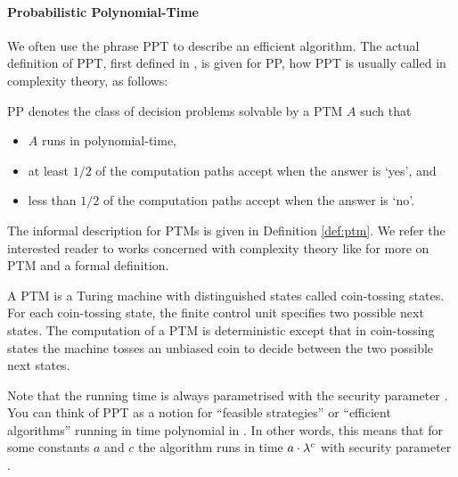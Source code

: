 \paragraph{Probabilistic Polynomial-Time}
We often use the phrase \ac{PPT} to describe an efficient algorithm.
The actual definition of \ac{PPT}, first defined in \cite{gill1977}, is given for \ac{PP}, how \ac{PPT} is usually called in complexity theory, as follows:

\begin{definition}[\acl{PP}]\label{def:ppt}
\ac{PP} denotes the class of decision problems solvable by a \ac{PTM} $A$ such that
\begin{itemize}
	\item $A$ runs in polynomial-time,
	\item at least $1/2$ of the computation paths accept when the answer is `yes', and
	\item less than $1/2$ of the computation paths accept when the answer is `no'. \eod
\end{itemize}
\end{definition}

\noindent
The informal description for \aclp{PTM} is given in Definition \ref{def:ptm}.
We refer the interested reader to works concerned with complexity theory like \cite{santos1969,WaterlooComplexity} for more on \ac{PTM} and a formal definition.

\begin{definition}\label{def:ptm}
A \ac{PTM} is a Turing machine with distinguished states called coin-tossing states.
For each coin-tossing state, the finite control unit specifies two possible next states.
The computation of a \ac{PTM} is deterministic except that in coin-tossing states the machine tosses an unbiased coin to decide between the two possible next states.
\end{definition}

\noindent
Note that the running time is always parametrised with the security parameter \secpar.
You can think of \ac{PPT} as a notion for ``feasible strategies'' or ``efficient algorithms'' running in time polynomial in \secpar.
In other words, this means that for some constants $a$ and $c$ the algorithm runs in time $a\cdot \lambda^c$ with security parameter \secpar \cite{katz2008introduction}.

